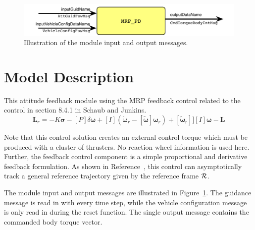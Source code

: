 

\begin{figure}[h]
	\centerline{
		\includegraphics{Figures/moduleImg}
	}
	\caption{Illustration of the module input and output messages.}
	\label{fig:moduleImg}
\end{figure}


\section{Model Description}
This attitude feedback module using the MRP feedback control related to the control in section 8.4.1 in Schaub and Junkins.\cite{schaub}
\begin{equation}
			\label{eq:Lr}
			\bm L_{r} =  -K \bm\sigma - [P] \delta\bm\omega   + [I](\dot{\bm\omega}_{r} - [\tilde{\bm\omega}]\bm\omega_{r}) 
			+[\tilde{\bm \omega}_{r}] ]
			[I]\bm\omega   - \bm L
\end{equation}

Note that this control solution creates an external control torque which must be produced with a cluster of thrusters.  No reaction wheel information is used here.  Further, the feedback control component is a simple proportional and derivative feedback formulation.  As shown in Reference~, this control can asymptotically track a general reference trajectory given by the reference frame $\cal R$.  

The module input and output messages are illustrated in Figure~\ref{fig:moduleImg}.  The guidance message is read in with every time step, while the vehicle configuration message is only read in during the reset function.  The single output message contains the commanded body torque vector.




